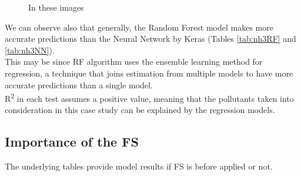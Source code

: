 \begin{figure}[H] 
    \centering
    \hfill%
    \caption{In these images }
    \label{fig:comparison-sensors}
\end{figure}
We can observe also that generally, the Random Forest model makes more accurate predictions than the Neural Network by Keras (Tables \ref{tab:nh3RF} and \ref{tab:nh3NN}). \\
This may be since RF algorithm uses the ensemble learning method for regression, a technique that joins estimation from multiple models to have more accurate predictions than a single model.\\ 
R\textsuperscript{2} in each test assumes a positive value, meaning that the pollutants taken into consideration in this case study can be explained by the regression models. 
\pagebreak

\subsection{Importance of the FS}
The underlying tables provide model results if FS is before applied or not.

